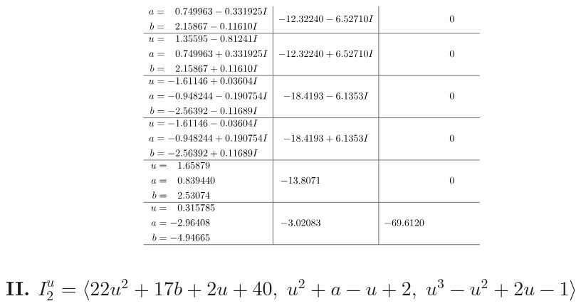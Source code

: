 \documentclass[1p]{elsarticle_modified}
\theoremstyle{definition}
\begin{document}
$$\begin{array}{c|c|c}
\begin{aligned}
a &= \phantom{-}0.749963 - 0.331925 I \\
b &= \phantom{-}2.15867 - 0.11610 I\end{aligned}
 & -12.32240 - 6.52710 I & \phantom{-0.000000 } 0 \\ \hline\begin{aligned}
u &= \phantom{-}1.35595 - 0.81241 I \\
a &= \phantom{-}0.749963 + 0.331925 I \\
b &= \phantom{-}2.15867 + 0.11610 I\end{aligned}
 & -12.32240 + 6.52710 I & \phantom{-0.000000 } 0 \\ \hline\begin{aligned}
u &= -1.61146 + 0.03604 I \\
a &= -0.948244 - 0.190754 I \\
b &= -2.56392 - 0.11689 I\end{aligned}
 & -18.4193 - 6.1353 I & \phantom{-0.000000 } 0 \\ \hline\begin{aligned}
u &= -1.61146 - 0.03604 I \\
a &= -0.948244 + 0.190754 I \\
b &= -2.56392 + 0.11689 I\end{aligned}
 & -18.4193 + 6.1353 I & \phantom{-0.000000 } 0 \\ \hline\begin{aligned}
u &= \phantom{-}1.65879\phantom{ +0.000000I} \\
a &= \phantom{-}0.839440\phantom{ +0.000000I} \\
b &= \phantom{-}2.53074\phantom{ +0.000000I}\end{aligned}
 & -13.8071\phantom{ +0.000000I} & \phantom{-0.000000 } 0 \\ \hline\begin{aligned}
u &= \phantom{-}0.315785\phantom{ +0.000000I} \\
a &= -2.96408\phantom{ +0.000000I} \\
b &= -4.94665\phantom{ +0.000000I}\end{aligned}
 & -3.02083\phantom{ +0.000000I} & -69.6120\phantom{ +0.000000I}\\
 \hline 
 \end{array}$$\newpage\newpage\renewcommand{\arraystretch}{1}
\centering \section*{II. $I^u_{2}= \langle 22 u^2+17 b+2 u+40,\;u^2+a- u+2,\;u^3- u^2+2 u-1 \rangle$}
\end{document}

